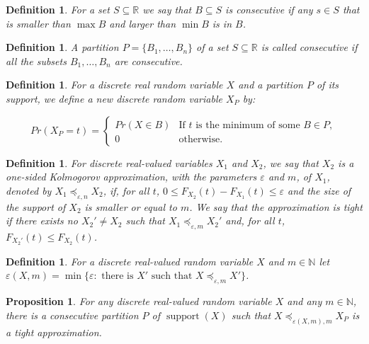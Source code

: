 \documentclass[review]{elsarticle}
\newtheorem{definition}[lemma]{Definition}
\newtheorem{proposition}[lemma]{Proposition}
\DeclareMathOperator{\supp}{support}
\begin{document}
\begin{definition}\label{consecutive} For a set $S \subseteq \mathbb{R}$ we say that
$B \subseteq S$ is \emph{consecutive} if any $s\in S$ that is smaller than $\max B$ and larger than $\min B$ is in $B$.
\end{definition}

\begin{definition}\label{part_consecutive} A partition $P=\{B_1,\dots,B_n\}$ of a set $S \subseteq \mathbb{R}$ is called 
\emph{consecutive} if all the subsets $B_1 ,\dots,B_n$ are consecutive.
\end{definition}


\begin{definition}\label{partition}
	For a discrete real random variable $X$ and a partition $P$ of its support, we define a new discrete random variable $X_P$ by:
	
	$$Pr(X_P = t) = \begin{cases} 
	Pr(X\in B) & \text{If $t$ is the minimum of some } B \in P, \\
	0      & \text{otherwise.}
	\end{cases}$$
\end{definition}


\begin{definition}
	For discrete real-valued variables $X_1$ and $X_2$, we say that $X_2$ is a one-sided Kolmogorov approximation, with the parameters $\varepsilon$ and $m$, of $X_1$, denoted by 
	$X_1 \preceq_{\varepsilon,n} X_2$, if, for all $t$, $0 \leq   F_{X_2}(t)-F_{X_1}(t) \leq \varepsilon$ and the size of the support of $X_2$ is smaller or equal to $m$. We say that the approximation is tight if there exists no  $X_2' \neq X_2$ such that $X_1 \preceq_{\varepsilon,m} X_2'$ and, for all $t$, $F_{X_2'}(t) \leq F_{X_2}(t)$. 
\end{definition}

\begin{definition}
	For a discrete real-valued random variable $X$ and $m \in \mathbb{N}$ let $\varepsilon(X,m) = \min\{\varepsilon \colon \text{ there is $X'$ such that $X \preceq_{\varepsilon,m} X'$}\}$. 
\end{definition}

\begin{proposition}
	For any discrete real-valued random variable $X$ and any $m \in \mathbb{N}$, there is a consecutive partition $P$ of $\supp(X)$ such that $X \preceq_{\varepsilon(X,m),m} X_P$ 
	is a tight approximation.
\end{proposition}
\end{document}
